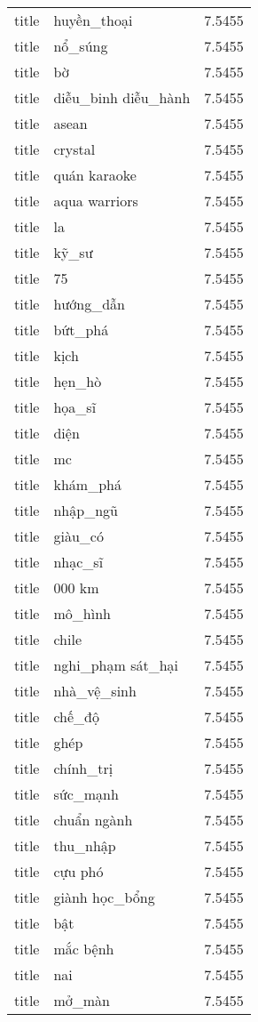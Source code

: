 \documentclass{article}
\begin{document}
\begin{tabular}{lll}
title & huyền\_thoại & 7.5455\\
title & nổ\_súng & 7.5455\\
title & bờ & 7.5455\\
title & diễu\_binh diễu\_hành & 7.5455\\
title & asean & 7.5455\\
title & crystal & 7.5455\\
title & quán karaoke & 7.5455\\
title & aqua warriors & 7.5455\\
title & la & 7.5455\\
title & kỹ\_sư & 7.5455\\
title & 75 & 7.5455\\
title & hướng\_dẫn & 7.5455\\
title & bứt\_phá & 7.5455\\
title & kịch & 7.5455\\
title & hẹn\_hò & 7.5455\\
title & họa\_sĩ & 7.5455\\
title & diện & 7.5455\\
title & mc & 7.5455\\
title & khám\_phá & 7.5455\\
title & nhập\_ngũ & 7.5455\\
title & giàu\_có & 7.5455\\
title & nhạc\_sĩ & 7.5455\\
title & 000 km & 7.5455\\
title & mô\_hình & 7.5455\\
title & chile & 7.5455\\
title & nghi\_phạm sát\_hại & 7.5455\\
title & nhà\_vệ\_sinh & 7.5455\\
title & chế\_độ & 7.5455\\
title & ghép & 7.5455\\
title & chính\_trị & 7.5455\\
title & sức\_mạnh & 7.5455\\
title & chuẩn ngành & 7.5455\\
title & thu\_nhập & 7.5455\\
title & cựu phó & 7.5455\\
title & giành học\_bổng & 7.5455\\
title & bật & 7.5455\\
title & mắc bệnh & 7.5455\\
title & nai & 7.5455\\
title & mở\_màn & 7.5455\\

\end{tabular}
\end{document}
